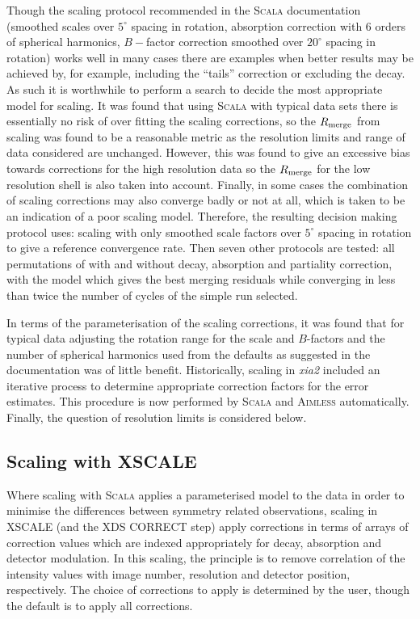 \documentclass[preprint,pdf]{iucr}
\begin{document}
Though the scaling protocol recommended in the \textsc{Scala} documentation
(smoothed scales over $5^{\circ}$ spacing in rotation, absorption
correction with 6 orders of spherical harmonics, $B-$factor correction
smoothed over $20^{\circ}$ spacing in rotation) works well in many
cases there are examples when better results may be achieved by,
for example, including the ``tails'' correction or excluding the
decay. As such it is worthwhile to perform a search to decide the most
appropriate model for scaling. It was found that using \textsc{Scala}
with typical data sets there is essentially no risk of over fitting
the scaling corrections, so the $R_{\rm{merge}}$ from scaling was found to
be a reasonable metric as the resolution limits and range of data
considered are unchanged. However, this was found to give an excessive
bias towards corrections for the high resolution data so the
$R_{\rm{merge}}$ for the low
resolution shell is also taken into account. Finally, in
some cases the combination of scaling corrections may also converge
badly or not at all, which is taken to be an indication of a poor
scaling model. Therefore, the resulting decision making
protocol uses: scaling with only smoothed scale
factors over $5^{\circ}$ spacing in rotation to give a reference
convergence rate. Then seven other protocols are tested: 
all permutations of with and
without decay, absorption and partiality correction, with the model
which gives the best merging residuals while converging in less than
twice the number of cycles of the simple run selected. 

In terms of the parameterisation of the scaling
corrections, it was found that for
typical data adjusting the rotation range for the scale and
$B$-factors and the number of spherical harmonics used from the
defaults as suggested in the documentation was of little benefit.
Historically, scaling in \emph{xia2} included an iterative process to
determine appropriate correction factors for the error estimates. This
procedure is now performed by \textsc{Scala} and \textsc{Aimless} automatically.
Finally, the question of resolution limits is considered below.

\subsection{Scaling with XSCALE}

Where scaling with \textsc{Scala} applies a parameterised model to the data
in order to minimise the differences between symmetry related
observations, scaling in XSCALE (and the XDS CORRECT step) apply
corrections in terms of arrays of correction values which are indexed
appropriately for decay, absorption and detector modulation. In this
scaling, the principle is to remove correlation of the intensity values
with image number, resolution and detector position, 
respectively. The choice of corrections to apply
is determined by the user, though the default is to apply all corrections.
\end{document}
